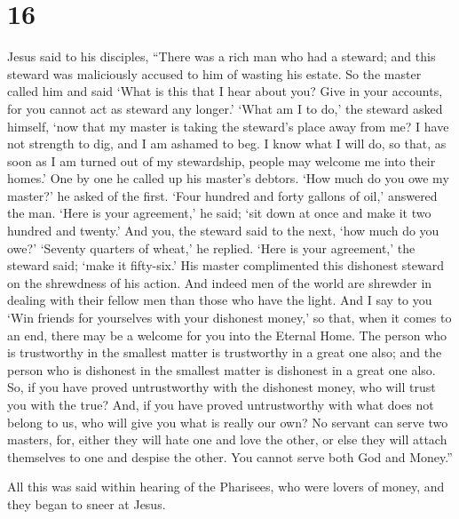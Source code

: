 \hypertarget{section-14}{%
\section{16}\label{section-14}}

 Jesus said to his disciples, ``There was a rich man who had
a steward; and this steward was maliciously accused to him of wasting
his estate.  So the master called him and said `What is this
that I hear about you? Give in your accounts, for you cannot act as
steward any longer.'  `What am I to do,' the steward asked
himself, `now that my master is taking the steward's place away from me?
I have not strength to dig, and I am ashamed to beg.  I know
what I will do, so that, as soon as I am turned out of my stewardship,
people may welcome me into their homes.'  One by one he
called up his master's debtors. `How much do you owe my master?' he
asked of the first.  `Four hundred and forty gallons of
oil,' answered the man. `Here is your agreement,' he said; `sit down at
once and make it two hundred and twenty.'  And you, the
steward said to the next, `how much do you owe?' `Seventy quarters of
wheat,' he replied. `Here is your agreement,' the steward said; `make it
fifty-six.'  His master complimented this dishonest steward
on the shrewdness of his action. And indeed men of the world are
shrewder in dealing with their fellow men than those who have the light.
 And I say to you `Win friends for yourselves with your
dishonest money,' so that, when it comes to an end, there may be a
welcome for you into the Eternal Home.  The person who is
trustworthy in the smallest matter is trustworthy in a great one also;
and the person who is dishonest in the smallest matter is dishonest in a
great one also.  So, if you have proved untrustworthy with
the dishonest money, who will trust you with the true? 
And, if you have proved untrustworthy with what does not belong to us,
who will give you what is really our own?  No servant can
serve two masters, for, either they will hate one and love the other, or
else they will attach themselves to one and despise the other. You
cannot serve both God and Money.''

 All this was said within hearing of the Pharisees, who
were lovers of money, and they began to sneer at Jesus.

